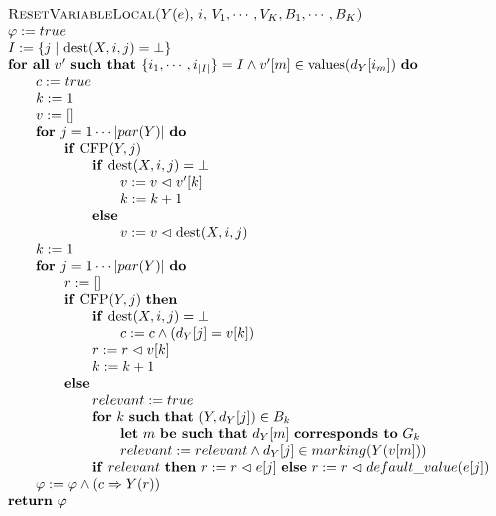 \begin{equation*}
\begin{tabular}{l}
\textsc{ResetVariableLocal(}$Y(e)$, $i,$ $V_{1},\cdots ,V_{K},B_{1},\cdots
,B_{K}$\textsc{)} \\ 
$\varphi :=true$ \\ 
$I:=\{j\mid \mathrm{dest}(X,i,j)=\bot \}$ \\ 
\textbf{for all} $v^{\prime }$ \textbf{such that }$\{i_{1},\cdots
,i_{\left\vert I\right\vert }\}=I\wedge v^{\prime }[m]\in \mathrm{values}%
(d_{Y}[i_{m}])$ \textbf{do} \\ 
$\qquad c:=true$ \\ 
$\qquad k:=1$ \\ 
$\qquad v:=[]$ \\ 
$\qquad $\textbf{for} $j=1\cdots \left\vert par(Y)\right\vert $ \textbf{do}
\\ 
$\qquad \qquad $\textbf{if} $\mathrm{CFP}(Y,j)$ \\ 
$\qquad \qquad \qquad $\textbf{if} $\mathrm{dest}(X,i,j)=\bot $ \\ 
$\qquad \qquad \qquad \qquad v:=v\vartriangleleft v^{\prime }[k]$ \\ 
$\qquad \qquad \qquad \qquad k:=k+1$ \\ 
$\qquad \qquad \qquad $\textbf{else} \\ 
$\qquad \qquad \qquad \qquad v:=v\vartriangleleft \mathrm{dest}(X,i,j)$ \\ 
$\qquad k:=1$ \\ 
$\qquad $\textbf{for} $j=1\cdots \left\vert par(Y)\right\vert $ \textbf{do}
\\ 
$\qquad \qquad r:=[]$ \\ 
$\qquad \qquad $\textbf{if} $\mathrm{CFP}(Y,j)$ \textbf{then} \\ 
$\qquad \qquad \qquad $\textbf{if} $\mathrm{dest}(X,i,j)=\bot $ \\ 
$\qquad \qquad \qquad \qquad c:=c\wedge (d_{Y}[j]=v[k])$ \\ 
$\qquad \qquad \qquad r:=r\vartriangleleft v[k]$ \\ 
$\qquad \qquad \qquad k:=k+1$ \\ 
$\qquad \qquad $\textbf{else} \\ 
$\qquad \qquad \qquad relevant:=true$ \\ 
$\qquad \qquad \qquad $\textbf{for} $k$ \textbf{such} \textbf{that} $%
(Y,d_{Y}[j])\in B_{k}$ \\ 
$\qquad \qquad \qquad \qquad $\textbf{let} $m$ \textbf{be such that} $%
d_{Y}[m]$ \textbf{corresponds to} $G_{k}$ \\ 
$\qquad \qquad \qquad \qquad relevant:=relevant\wedge d_{Y}[j]\in
marking(Y(v[m]))$ \\ 
$\qquad \qquad \qquad $\textbf{if} $relevant$ \textbf{then} $%
r:=r\vartriangleleft e[j]$ \textbf{else} $r:=r\vartriangleleft
default\_value(e[j])$ \\ 
$\qquad \varphi :=\varphi \wedge (c\Rightarrow Y(r))$ \\ 
\textbf{return} $\varphi $%
\end{tabular}%
\end{equation*}


